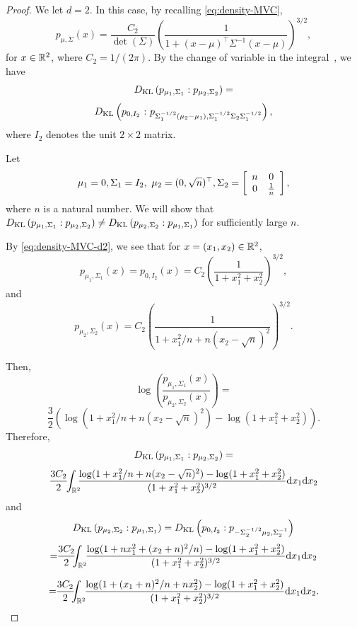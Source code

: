 \documentclass[journal]{IEEEtran}
\begin{document}
\begin{proof}
We let $d=2$.
In this case, by recalling \eqref{eq:density-MVC}, 
\begin{equation}\label{eq:density-MVC-d2}
 p_{\mu, \Sigma}(x) = \frac{C_2}{\det(\Sigma)} \left( \frac{1}{1+ \left(x - \mu\right)^{\top} \Sigma^{-1} \left(x-\mu\right)}\right)^{3/2}, 
\end{equation}
for $x \in {\mathbb{R}}^2$, where $C_2 = 1/(2\pi)$. 
By the change of variable in the integral~\cite{infproj-2021}, we have
$$
D_{\mathrm{KL}}\left(p_{\mu_1, \Sigma_1} : p_{\mu_2, \Sigma_2} \right) = $$
$$
D_\KL\left(p_{0, I_2} \ { : } \ p_{\Sigma_1^{-1/2}(\mu_2 - \mu_1), \Sigma_1^{-1/2} \Sigma_2 \Sigma_1^{-1/2}}\right), 
$$
where $I_2$ denotes the unit {$2 \times 2$} matrix. 

Let 
$$
\mu_1 = 0, \Sigma_1 = I_2, \  \mu_2 = (0,\sqrt{n})^\top,  \Sigma_2 = \left[\begin{array}{cc}n & 0\\ 0 & \frac{1}{n}\end{array}\right], 
$$
where $n$ is a natural number.  
We will show that $D_{\mathrm{KL}}\left(p_{\mu_1, \Sigma_1}: p_{\mu_2, \Sigma_2} \right) \not=
D_{\mathrm{KL}}\left(p_{\mu_2, \Sigma_2}: p_{\mu_1, \Sigma_1} \right)$ for sufficiently large $n$. 

By \eqref{eq:density-MVC-d2}, 
we see that for $x = (x_1, x_2) \in {\mathbb{R}}^2$, 
\[ p_{\mu_1, \Sigma_1}(x) = p_{0, I_2}(x) = C_2 \left( \frac{1}{1+ x_1^2 + x_2^2}\right)^{3/2}, \]
and 
\[  p_{\mu_2, \Sigma_2}(x) =  C_2 \left( \frac{1}{1+ x_1^2/n + n(x_2 - \sqrt{n})^2}\right)^{3/2}. \]

Then, 
\[ \log \left( \frac{p_{\mu_1, \Sigma_1}(x)}{p_{\mu_2, \Sigma_2}(x)} \right) = \]
\[\frac{3}{2} \left( \log \left( 1+ x_1^2/n + n(x_2 - \sqrt{n})^2 \right) - \log \left(1+ x_1^2 + x_2^2 \right) \right).  \]
Therefore, 
$$
D_{\mathrm{KL}}\left(p_{\mu_1, \Sigma_1} : p_{\mu_2, \Sigma_2} \right) = $$
$$
\frac{3{C_2}}{2} \!\! \int_{{\mathbb{R}}^2}\!\!\!\frac{\log(1+ x_1^2 / n + n (x_2 - \sqrt{n})^2) - \log(1 + x_1^2 + x_2^2)}{(1 + x_1^2 + x_2^2)^{3/2}} \mathrm{d}x_1 \mathrm{d}x_2 
$$
and
\[ D_{\mathrm{KL}}\left(p_{\mu_2, \Sigma_2} : p_{\mu_1, \Sigma_1} \right) = 
D_{\mathrm{KL}}\left(p_{0, I_2} : p_{-\Sigma_2^{-1/2}\mu_2, \Sigma_2^{-1}}\right) \]
\[ = \!\! \frac{3{C_2}}{2}\!\!\!\int_{{\mathbb{R}}^2}\!\!\dfrac{\log(1+n x_1^2  + (x_2 + n)^2/n) - \log(1 + x_1^2 + x_2^2)}{(1 + x_1^2 + x_2^2)^{3/2}} \mathrm{d}x_1 \mathrm{d}x_2\]

\[ = \!\! \frac{3{C_2}}{2}\!\!\!\int_{{\mathbb{R}}^2}\!\!\dfrac{\log(1  + (x_1 + n)^2/n +n x_2^2) - \log(1 + x_1^2 + x_2^2)}{(1 + x_1^2 + x_2^2)^{3/2}} \mathrm{d}x_1 \mathrm{d}x_2. \]



\end{proof}
\end{document}
